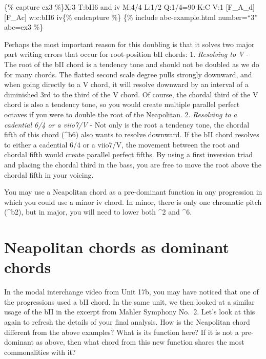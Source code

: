 \documentclass{book}
\begin{document}
\{\% capture ex3 \%\}X:3 T:bII6 and iv M:4/4 L:1/2 Q:1/4=90 K:C V:1
{[}F\_A\_d{]} {[}F\_Ac{]}\textbar{]} w:c:bII6 iv\{\% endcapture \%\} \{\%
include abc-example.html number=``3'' abc=ex3 \%\}

Perhaps the most important reason for this doubling is that it solves two
major part writing errors that occur for root-position bII chords: 1.
\emph{Resolving to V} - The root of the bII chord is a tendency tone and
should not be doubled as we do for many chords. The flatted second scale
degree pulls strongly downward, and when going directly to a V chord, it will
resolve downward by an interval of a diminished 3rd to the third of the V
chord. Of course, the chordal third of the V chord is also a tendency tone, so
you would create multiple parallel perfect octaves if you were to double the
root of the Neapolitan. 2. \emph{Resolving to a cadential 6/4 or a viio7/V} -
Not only is the root a tendency tone, the chordal fifth of this chord (\^{}b6)
also wants to resolve downward. If the bII chord resolves to either a
cadential 6/4 or a viio7/V, the movement between the root and chordal fifth
would create parallel perfect fifths. By using a first inversion triad and
placing the chordal third in the bass, you are free to move the root above the
chordal fifth in your voicing.

You may use a Neapolitan chord as a pre-dominant function in any progression
in which you could use a minor iv chord. In minor, there is only one chromatic
pitch (\^{}b2), but in major, you will need to lower both \^{}2 and \^{}6.

\hypertarget{neapolitan-chords-as-dominant-chords}{%
\section{Neapolitan chords as dominant
chords}\label{neapolitan-chords-as-dominant-chords}}

In the modal interchange video from Unit 17b, you may have noticed that one of
the progressions used a bII chord. In the same unit, we then looked at a
similar usage of the bII in the excerpt from Mahler Symphony No.~2. Let's look
at this again to refresh the details of your final analysis. How is the
Neapolitan chord different from the above examples? What is its function here?
If it is not a pre-dominant as above, then what chord from this new function
shares the most commonalities with it?
\end{document}
